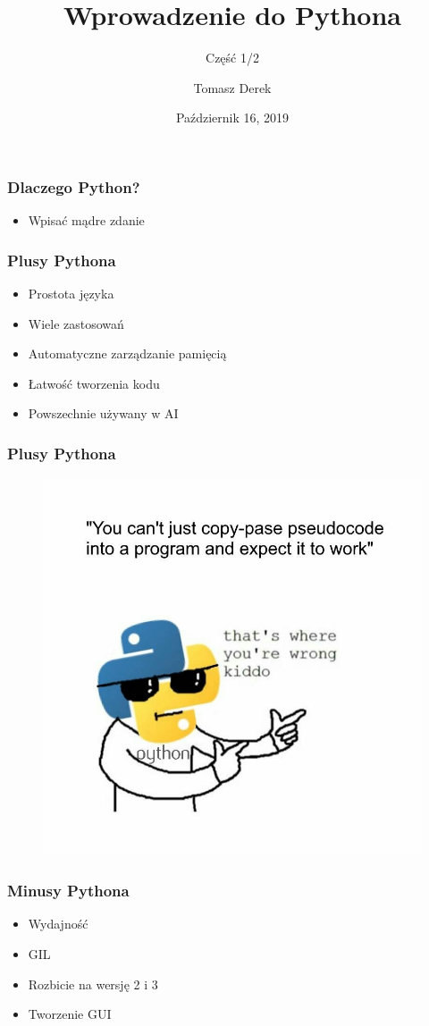 \documentclass[17pt]{beamer}
\title{Wprowadzenie do Pythona}
\subtitle{Część 1/2}
\author{Tomasz Derek}
\institute{KMS}
\date{Październik 16, 2019}
\begin{document}
 
\frame{\titlepage}
 
\begin{frame}
\frametitle{Dlaczego Python?}
\begin{itemize}
\item Wpisać mądre zdanie
\end{itemize}
\end{frame} 
 
\begin{frame}
\frametitle{Plusy Pythona}
\begin{itemize}
\item Prostota języka
\item Wiele zastosowań
\item Automatyczne zarządzanie pamięcią
\item Łatwość tworzenia kodu
\item Powszechnie używany w AI
\end{itemize}
\end{frame}

\begin{frame}
\frametitle{Plusy Pythona}
\begin{figure}[ht]
\includegraphics[scale=0.25]{./kiddo.jpeg}
\end{figure}
\end{frame}

\begin{frame}
\frametitle{Minusy Pythona}
\begin{itemize}
\item Wydajność
\item GIL
\item Rozbicie na wersję 2 i 3
\item Tworzenie GUI
\end{itemize}
\end{frame}
\end{document}
